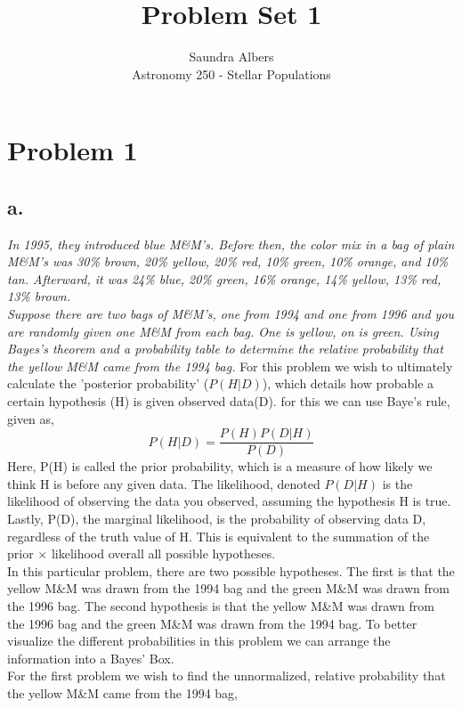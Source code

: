\documentclass[english,12pt]{article}
\begin{document}
 

 
\title{Problem Set 1}
\author{Saundra Albers\\ 
Astronomy 250 - Stellar Populations} 
 
\maketitle
 

\section*{Problem 1}

\subsection*{a.}
\textit{In 1995, they introduced blue M\&M's. Before then, the color mix in a bag of plain M\&M's was 30\% brown, 20\% yellow, 20\% red, 10\% green, 10\% orange, and 10\% tan. Afterward, it was 24\% blue, 20\% green, 16\% orange, 14\% yellow, 13\% red, 13\% brown.\\ 
Suppose there are two bags of M\&M's, one from 1994 and one from 1996 and you are randomly given one M\&M from each bag. One is yellow, on is green. Using Bayes's theorem and a probability table to determine the relative probability that the yellow M\&M came from the 1994 bag.}
For this problem we wish to ultimately calculate the 'posterior probability' ($P(H|D)$), which details how probable a certain hypothesis (H) is given observed data(D). for this we can use Baye's rule, given as, 
\begin{equation}
P(H|D) = \frac{P(H)P(D|H)}{P(D)}
\end{equation}
Here, P(H) is called the prior probability, which is a measure of how likely we think H is before any given data. The likelihood, denoted $P(D|H)$ is the likelihood of observing the data you observed, assuming the hypothesis H is true. Lastly, P(D), the marginal likelihood, is the probability of observing data D, regardless of the truth value of H. This is equivalent to the summation of the prior $\times$ likelihood overall all possible hypotheses.\\
In this particular problem, there are two possible hypotheses. The first is that the yellow M\&M was drawn from the 1994 bag and the green M\&M was drawn from the 1996 bag. The second hypothesis is that the yellow M\&M was drawn from the 1996 bag and the green M\&M was drawn from the 1994 bag. To better visualize the different probabilities in this problem we can arrange the information into a Bayes' Box. \\
For the first problem we wish to find the unnormalized, relative probability that the yellow M\&M came from the 1994 bag,
\end{document}

